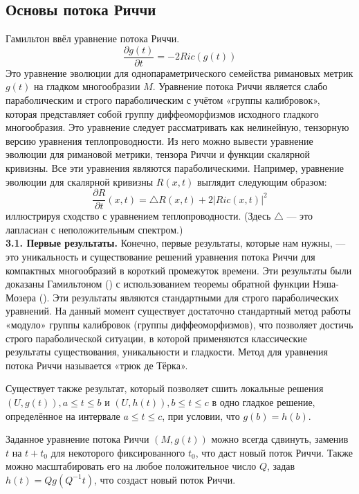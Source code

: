 \subsection{Основы потока Риччи}

Гамильтон \cite{c29} ввёл уравнение потока Риччи.
\[
\frac{\partial g(t)}{\partial t} = -2Ric(g(t))
\]
Это уравнение эволюции для однопараметрического семейства 
римановых метрик $g(t)$ на гладком многообразии $M$. 
Уравнение потока Риччи является слабо параболическим и 
строго параболическим с учётом «группы калибровок», 
которая представляет собой группу диффеоморфизмов 
исходного гладкого многообразия. 
Это уравнение следует рассматривать как нелинейную, 
тензорную версию уравнения теплопроводности. 
Из него можно вывести уравнение эволюции для римановой метрики, 
тензора Риччи и функции скалярной кривизны. 
Все эти уравнения являются параболическими. 
Например, уравнение эволюции для скалярной кривизны 
$R(x,t)$ выглядит следующим образом:
\begin{equation}
    \frac{\partial R}{\partial t}(x,t) = \bigtriangleup R(x,t)+2{| Ric(x,t)|}^2
    \label{eqn0.1}
\end{equation}
иллюстрируя сходство с уравнением теплопроводности. 
(Здесь $\bigtriangleup$ — это лапласиан с неположительным спектром.)\\

\textbf{3.1. Первые результаты.} Конечно, первые результаты, которые нам нужны, 
— это уникальность и существование решений уравнения потока Риччи для 
компактных многообразий в короткий промежуток времени. Эти результаты 
были доказаны Гамильтоном (\cite{c29}) с использованием теоремы обратной функции 
Нэша-Мозера (\cite{c28}). Эти результаты являются стандартными для строго 
параболических уравнений. На данный момент существует достаточно стандартный 
метод работы «модуло» группы калибровок (группы диффеоморфизмов), что 
позволяет достичь строго параболической ситуации, в которой применяются 
классические результаты существования, уникальности и гладкости. Метод для 
уравнения потока Риччи называется «трюк де Тёрка».

Существует также результат, который позволяет сшить локальные решения 
$(U,g(t)),a\leq t\leq b$ и $(U,h(t)),b\leq t\leq c$ в одно гладкое решение, 
определённое на интервале $a\leq t\leq c$, при условии, что 
$g(b)=h(b)$.

Заданное уравнение потока Риччи $(M,g(t))$ можно всегда сдвинуть, 
заменив $t$ на $t+t_0$ для некоторого фиксированного $t_0$, что даст 
новый поток Риччи. Также можно масштабировать его на любое 
положительное число $Q$, задав $h(t)=Q g(Q^{-1} t)$, 
что создаст новый поток Риччи.\\


